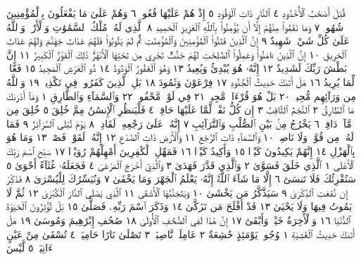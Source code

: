 قُتِلَ أَصْحَٰبُ ٱلْأُخْدُودِ ٤ ٱلنَّارِ ذَاتِ ٱلْوَقُودِ ٥ إِذْ هُمْ عَلَيْهَا
قُعُودࣱ ٦ وَهُمْ عَلَىٰ مَا يَفْعَلُونَ بِٱلْمُؤْمِنِينَ شُهُودࣱ ٧ وَمَا نَقَمُوا۟
مِنْهُمْ إِلَّآ أَن يُؤْمِنُوا۟ بِٱللَّهِ ٱلْعَزِيزِ ٱلْحَمِيدِ ٨ ٱلَّذِي لَهُۥ مُلْكُ
ٱلسَّمَٰوَٰتِ وَٱلْأَرْضِۚ وَٱللَّهُ عَلَىٰ كُلِّ شَيْءࣲ شَهِيدٌ ٩ إِنَّ ٱلَّذِينَ
فَتَنُوا۟ ٱلْمُؤْمِنِينَ وَٱلْمُؤْمِنَٰتِ ثُمَّ لَمْ يَتُوبُوا۟ فَلَهُمْ عَذَابُ جَهَنَّمَ وَلَهُمْ
عَذَابُ ٱلْحَرِيقِ ١٠ إِنَّ ٱلَّذِينَ ءَامَنُوا۟ وَعَمِلُوا۟ ٱلصَّٰلِحَٰتِ لَهُمْ
جَنَّٰتࣱ تَجْرِي مِن تَحْتِهَا ٱلْأَنْهَٰرُۚ ذَٰلِكَ ٱلْفَوْزُ ٱلْكَبِيرُ ١١ إِنَّ بَطْشَ
رَبِّكَ لَشَدِيدٌ ١٢ إِنَّهُۥ هُوَ يُبْدِئُ وَيُعِيدُ ١٣ وَهُوَ ٱلْغَفُورُ ٱلْوَدُودُ ١٤
ذُو ٱلْعَرْشِ ٱلْمَجِيدُ ١٥ فَعَّالࣱ لِّمَا يُرِيدُ ١٦ هَلْ أَتَىٰكَ حَدِيثُ
ٱلْجُنُودِ ١٧ فِرْعَوْنَ وَثَمُودَ ١٨ بَلِ ٱلَّذِينَ كَفَرُوا۟ فِي تَكْذِيبࣲ ١٩ وَٱللَّهُ
مِن وَرَآئِهِم مُّحِيطُۢ ٢٠ بَلْ هُوَ قُرْءَانࣱ مَّجِيدࣱ ٢١ فِي لَوْحࣲ مَّحْفُوظِۭ ٢٢
وَٱلسَّمَآءِ وَٱلطَّارِقِ ١ وَمَآ أَدْرَىٰكَ مَا ٱلطَّارِقُ ٢ ٱلنَّجْمُ ٱلثَّاقِبُ ٣
إِن كُلُّ نَفْسࣲ لَّمَّا عَلَيْهَا حَافِظࣱ ٤ فَلْيَنظُرِ ٱلْإِنسَٰنُ مِمَّ خُلِقَ ٥
خُلِقَ مِن مَّآءࣲ دَافِقࣲ ٦ يَخْرُجُ مِنۢ بَيْنِ ٱلصُّلْبِ وَٱلتَّرَآئِبِ ٧ إِنَّهُۥ
عَلَىٰ رَجْعِهِۦ لَقَادِرࣱ ٨ يَوْمَ تُبْلَى ٱلسَّرَآئِرُ ٩ فَمَا لَهُۥ مِن قُوَّةࣲ وَلَا
نَاصِرࣲ ١٠ وَٱلسَّمَآءِ ذَاتِ ٱلرَّجْعِ ١١ وَٱلْأَرْضِ ذَاتِ ٱلصَّدْعِ ١٢
إِنَّهُۥ لَقَوْلࣱ فَصْلࣱ ١٣ وَمَا هُوَ بِٱلْهَزْلِ ١٤ إِنَّهُمْ يَكِيدُونَ كَيْدࣰا ١٥
وَأَكِيدُ كَيْدࣰا ١٦ فَمَهِّلِ ٱلْكَٰفِرِينَ أَمْهِلْهُمْ رُوَيْدَۢا ١٧
سَبِّحِ ٱسْمَ رَبِّكَ ٱلْأَعْلَى ١ ٱلَّذِي خَلَقَ فَسَوَّىٰ ٢ وَٱلَّذِي قَدَّرَ
فَهَدَىٰ ٣ وَٱلَّذِيٓ أَخْرَجَ ٱلْمَرْعَىٰ ٤ فَجَعَلَهُۥ غُثَآءً أَحْوَىٰ ٥
سَنُقْرِئُكَ فَلَا تَنسَىٰٓ ٦ إِلَّا مَا شَآءَ ٱللَّهُۚ إِنَّهُۥ يَعْلَمُ ٱلْجَهْرَ وَمَا يَخْفَىٰ ٧
وَنُيَسِّرُكَ لِلْيُسْرَىٰ ٨ فَذَكِّرْ إِن نَّفَعَتِ ٱلذِّكْرَىٰ ٩ سَيَذَّكَّرُ مَن يَخْشَىٰ ١٠
وَيَتَجَنَّبُهَا ٱلْأَشْقَى ١١ ٱلَّذِي يَصْلَى ٱلنَّارَ ٱلْكُبْرَىٰ ١٢ ثُمَّ لَا يَمُوتُ
فِيهَا وَلَا يَحْيَىٰ ١٣ قَدْ أَفْلَحَ مَن تَزَكَّىٰ ١٤ وَذَكَرَ ٱسْمَ رَبِّهِۦ فَصَلَّىٰ ١٥
بَلْ تُؤْثِرُونَ ٱلْحَيَوٰةَ ٱلدُّنْيَا ١٦ وَٱلْأٓخِرَةُ خَيْرࣱ وَأَبْقَىٰٓ ١٧ إِنَّ
هَٰذَا لَفِي ٱلصُّحُفِ ٱلْأُولَىٰ ١٨ صُحُفِ إِبْرَٰهِيمَ وَمُوسَىٰ ١٩
هَلْ أَتَىٰكَ حَدِيثُ ٱلْغَٰشِيَةِ ١ وُجُوهࣱ يَوْمَئِذٍ خَٰشِعَةٌ ٢ عَامِلَةࣱ
نَّاصِبَةࣱ ٣ تَصْلَىٰ نَارًا حَامِيَةࣰ ٤ تُسْقَىٰ مِنْ عَيْنٍ ءَانِيَةࣲ ٥ لَّيْسَ
